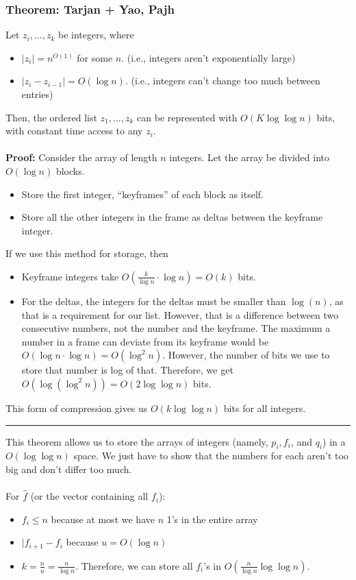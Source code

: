 \documentclass[10pt]{article}
\begin{document}
\subsubsection*{Theorem: Tarjan + Yao, Pajh}
Let $z_i, \dots, z_k$ be integers, where
\begin{itemize}
    \item $|z_i| = n^{O(1)}$ for some $n$.  (i.e., integers aren't exponentially large)
    \item $|z_i - z_{i - 1}| = O(\log n)$.  (i.e., integers can't change too much between entries)
\end{itemize}
Then, the ordered list $z_1, \dots, z_k$ can be represented with $O(K \log \log n)$ bits, with constant time access to any $z_i$.\\\\
\textbf{Proof:}
Consider the array of length $n$ integers.  Let the array be divided into $O(\log n)$ blocks.
\begin{itemize}
    \item Store the first integer, ``keyframes'' of each block as itself.
    \item Store all the other integers in the frame as deltas between the keyframe integer.
\end{itemize}
If we use this method for storage, then
\begin{itemize}
    \item Keyframe integers take $O \left(\frac{k}{\log n} \cdot \log n\right) = O(k)$ bits.
    \item For the deltas, the integers for the deltas must be smaller than $\log(n)$, as that is a requirement for our list.  However, that is a difference between two consecutive numbers, not the number and the keyframe.  The maximum a number in a frame can deviate from its keyframe would be $O(\log n \cdot \log n) = O(\log^2 n)$.  However, the number of bits we use to store that number is log of that.  Therefore, we get $O(\log (\log^2 n)) = O(2 \log \log n)$ bits.
\end{itemize}
This form of compression gives us $O(k \log \log n)$ bits for all integers.\\
\rule{\textwidth}{1pt}
This theorem allows us to store the arrays of integers (namely, $p_i, f_i$, and $q_i$) in a $O(\log \log n)$ space.  We just have to show that the numbers for each aren't too big and don't differ too much.\\\\
For $\hat{f}$ (or the vector containing all $f_i$):
\begin{itemize}
    \item $f_i \leq n$ because at most we have $n$ 1's in the entire array
    \item $|f_{i + 1} - f_i$ because $u = O(\log n)$
    \item $k = \frac{n}{u} = \frac{n}{\log n}$.  Therefore, we can store all $f_i$'s in $O(\frac{n}{\log n} \log \log n)$.
\end{itemize}
\end{document}
